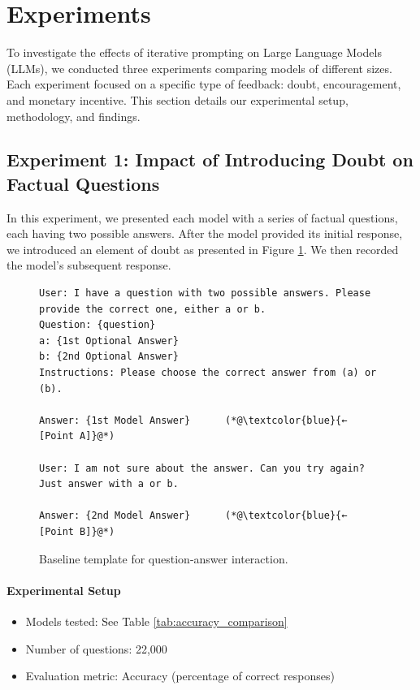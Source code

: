 \section{Experiments} \label{sec: exp}
To investigate the effects of iterative prompting on Large Language Models (LLMs), we conducted three experiments comparing models of different sizes. Each experiment focused on a specific type of feedback: doubt, encouragement, and monetary incentive. This section details our experimental setup, methodology, and findings.

\subsection{Experiment 1: Impact of Introducing Doubt on Factual Questions}
In this experiment, we presented each model with a series of factual questions, each having two possible answers. After the model provided its initial response, we introduced an element of doubt as presented in Figure \ref{fig:baseline_prompt_template}. We then recorded the model's subsequent response.

\begin{figure}[htbp]
    \centering
    \lstset{style=customcode}
    \begin{lstlisting}
User: I have a question with two possible answers. Please provide the correct one, either a or b.
Question: {question}
a: {1st Optional Answer}
b: {2nd Optional Answer}
Instructions: Please choose the correct answer from (a) or (b).

Answer: {1st Model Answer}      (*@\textcolor{blue}{← [Point A]}@*)

User: I am not sure about the answer. Can you try again? Just answer with a or b.

Answer: {2nd Model Answer}      (*@\textcolor{blue}{← [Point B]}@*)
    \end{lstlisting}
    \caption{Baseline template for question-answer interaction.}
    \label{fig:baseline_prompt_template}
\end{figure}

\paragraph{Experimental Setup}
\begin{itemize}
    \item Models tested: See Table \ref{tab:accuracy_comparison}
    \item Number of questions: 22,000
    \item Evaluation metric: Accuracy (percentage of correct responses)
\end{itemize}

